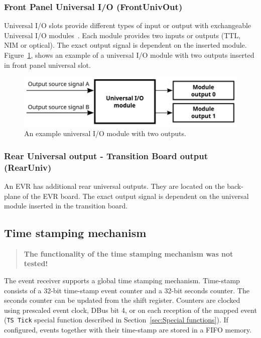 \documentclass[12pt,a4paper]{article}
\begin{document}
\subsubsection{Front Panel Universal I/O (FrontUnivOut)}\label{sec:Front Panel Universal I/O}
Universal I/O slots provide different types of input or output with exchangeable Universal I/O modules~\cite{mrf}. Each module provides two inputs or outputs (TTL, NIM or optical). 
The exact output signal is dependent on the inserted module. Figure~\ref{fig:output_univ}, shows an example of a universal I/O module with two outputs inserted in front panel universal slot.
\begin{figure}[H]
	\centering
	\includegraphics[]{./img/univ}
	\caption{An example universal I/O module with two outputs.}
	\label{fig:output_univ}
\end{figure}

\subsubsection{Rear Universal output - Transition Board output (RearUniv)}\label{sec:Rear Universal output}
An EVR has additional rear universal outputs. They are located on the back-plane of the EVR board. The exact output signal is dependent on the universal module inserted in the transition board.

\subsection{Time stamping mechanism}\label{sec:Time stamping mechanism}
\begin{quote}
\textbf{The functionality of the time stamping mechanism was not tested!}
\end{quote}
The event receiver supports a global time stamping mechanism. Time-stamp consists of a 32-bit time-stamp event counter and a 32-bit seconds counter. The seconds counter can be updated from the
shift register. Counters are clocked using prescaled event clock, DBus bit 4, or on each reception of the mapped event (\texttt{TS Tick} special function described in Section~\ref{sec:Special functions}). If configured, events together with their time-stamp are stored in a FIFO memory.
\end{document}
